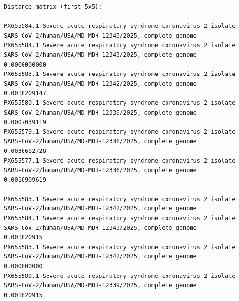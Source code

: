 \documentclass[
  11pt,
]{article}
\newenvironment{rpoutput}{\vspace{0.5em}\begin{snugshade}}{\end{snugshade}}
\begin{document}
\begin{rpoutput}

\begin{verbatim}
Distance matrix (first 5x5):
                                                                                                                           PX655584.1 Severe acute respiratory syndrome coronavirus 2 isolate SARS-CoV-2/human/USA/MD-MDH-12343/2025, complete genome
PX655584.1 Severe acute respiratory syndrome coronavirus 2 isolate SARS-CoV-2/human/USA/MD-MDH-12343/2025, complete genome                                                                                                               0.0000000000
PX655583.1 Severe acute respiratory syndrome coronavirus 2 isolate SARS-CoV-2/human/USA/MD-MDH-12342/2025, complete genome                                                                                                               0.0010209147
PX655580.1 Severe acute respiratory syndrome coronavirus 2 isolate SARS-CoV-2/human/USA/MD-MDH-12339/2025, complete genome                                                                                                               0.0007039119
PX655579.1 Severe acute respiratory syndrome coronavirus 2 isolate SARS-CoV-2/human/USA/MD-MDH-12338/2025, complete genome                                                                                                               0.0030682728
PX655577.1 Severe acute respiratory syndrome coronavirus 2 isolate SARS-CoV-2/human/USA/MD-MDH-12336/2025, complete genome                                                                                                               0.0016909619
                                                                                                                           PX655583.1 Severe acute respiratory syndrome coronavirus 2 isolate SARS-CoV-2/human/USA/MD-MDH-12342/2025, complete genome
PX655584.1 Severe acute respiratory syndrome coronavirus 2 isolate SARS-CoV-2/human/USA/MD-MDH-12343/2025, complete genome                                                                                                                0.001020915
PX655583.1 Severe acute respiratory syndrome coronavirus 2 isolate SARS-CoV-2/human/USA/MD-MDH-12342/2025, complete genome                                                                                                                0.000000000
PX655580.1 Severe acute respiratory syndrome coronavirus 2 isolate SARS-CoV-2/human/USA/MD-MDH-12339/2025, complete genome                                                                                                                0.001020915

\end{verbatim}
\end{rpoutput}
\end{document}
